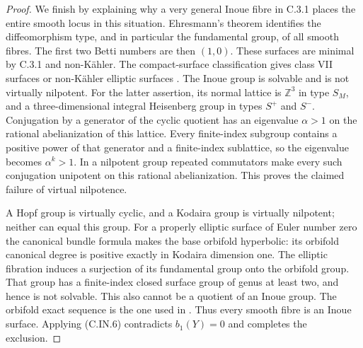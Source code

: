 \begin{proof}
We finish by explaining why a very general Inoue fibre in C.3.1
places the entire smooth locus in this situation. Ehresmann's
theorem identifies the diffeomorphism type, and in particular
the fundamental group, of all smooth fibres. The first two
Betti numbers are then $(1,0)$. These surfaces are minimal by
C.3.1 and non-K\"ahler. The compact-surface classification
gives class VII surfaces or non-K\"ahler elliptic surfaces
\cite[Theorem 3.2]{BMS2012}.
The Inoue group is solvable and is not virtually nilpotent.
For the latter assertion, its normal lattice is $\mathbb Z^3$
in type $S_M$, and a three-dimensional integral Heisenberg group
in types $S^{+}$ and $S^{-}$. Conjugation by a generator of the
cyclic quotient has an eigenvalue $\alpha>1$ on the rational
abelianization of this lattice. Every finite-index subgroup
contains a positive power of that generator and a finite-index
sublattice, so the eigenvalue becomes $\alpha^k>1$. In a
nilpotent group repeated commutators make every such conjugation
unipotent on this rational abelianization. This proves the
claimed failure of virtual nilpotence.

A Hopf group is virtually cyclic, and a Kodaira group is virtually
nilpotent; neither can equal this group. For a properly elliptic
surface of Euler number zero the canonical bundle formula makes
the base orbifold hyperbolic: its orbifold canonical degree is
positive exactly in Kodaira dimension one. The elliptic
fibration induces a surjection of its fundamental group onto the
orbifold group. That group has a finite-index closed surface
group of genus at least two, and hence is not solvable. This
also cannot be a quotient of an Inoue group. The orbifold exact
sequence is the one used in \cite[Section 3.3]{BMS2012}.
Thus every smooth fibre is an Inoue surface. Applying (C.IN.6)
contradicts $b_1(Y)=0$ and completes the exclusion.
\end{proof}

